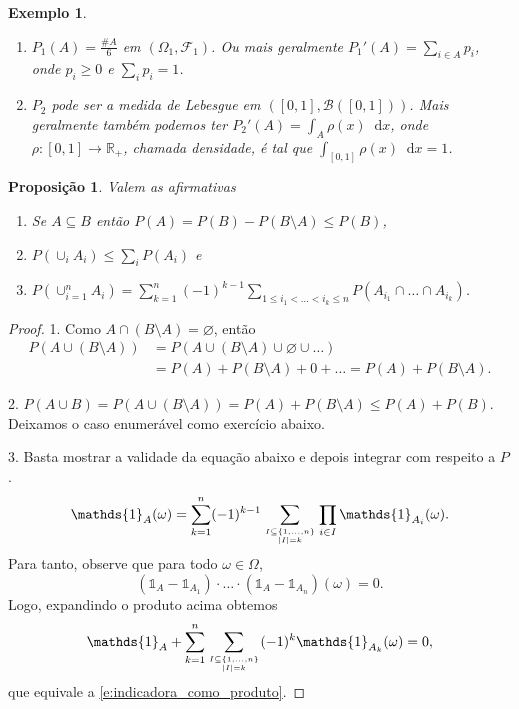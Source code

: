 \documentclass[reqno]{article}
\newcommand*\1{\mathds{1}}
\newtheorem{proposition}[theorem]{Proposição}
\newtheorem{example}{Exemplo}[section]
\renewcommand*\d{\mathop{}\!\mathrm{d}}
\begin{document}
\begin{example} \mbox{}
  \begin{enumerate}
  \item $P_1(A) = \tfrac{\#A}{6}$ em $(\Omega_1, \mathcal{F}_1)$.
    Ou mais geralmente $P_1'(A) = \sum_{i \in A} p_i$, onde $p_i \geq 0$ e $\sum_i p_i = 1$.
  \item $P_2$ pode ser a medida de Lebesgue em $([0,1], \mathcal{B}([0,1]))$.
    Mais geralmente também podemos ter $P_2'(A) = \int_A \rho(x) \d x$, onde $\rho:[0,1] \to \mathbb{R}_+$, chamada densidade, é tal que $\int_{[0,1]} \rho (x) \d x = 1$.
  \end{enumerate}
\end{example}

\begin{proposition}
  Valem as afirmativas
  \begin{enumerate}
  \item Se $A \subseteq B$ então $P(A) = P(B) - P(B \setminus A) \leq P(B)$,
  \item $P(\cup_i A_i) \leq \sum_i P(A_i)$ e
  \item $P(\cup_{i=1}^n A_i) = \sum_{k = 1}^n (-1)^{k-1} \sum_{1 \leq i_1 < \dots < i_k \leq n} P(A_{i_1} \cap \dots \cap A_{i_k})$.
  \end{enumerate}
\end{proposition}


\begin{proof}
  1.
  Como $A \cap (B \setminus A) = \varnothing$, então
  \begin{equation}
    \begin{split}
      P(A \cup (B \setminus A)) & = P(A \cup (B \setminus A) \cup \varnothing \cup \dots)\\
      & = P(A) + P(B \setminus A) + 0 + \dots = P(A) + P(B \setminus A).
    \end{split}
  \end{equation}

  2.
  $P(A \cup B) = P (A \cup (B \setminus A)) = P(A) + P(B \setminus A) \leq P(A) + P(B)$.
  Deixamos o caso enumerável como exercício abaixo.

  3.
  Basta mostrar a validade da equação abaixo e depois integrar com respeito a $P$.
  \begin{equation}
    \label{e:indicadora_como_produto}
    \1_A(\omega) = \sum_{k=1}^n (-1)^{k - 1} \sum_{I \subseteq \{1, \dots, n\} \atop |I| = k} \prod_{i \in I} \1_{A_i}(\omega).
  \end{equation}
  Para tanto, observe que para todo $\omega \in \Omega$,
  \begin{equation}
    (\1_A - \1_{A_1}) \cdot \dots \cdot (\1_A - \1_{A_n})(\omega) = 0.
  \end{equation}
  Logo, expandindo o produto acima obtemos
  \begin{equation}
    \1_A + \sum_{k = 1}^n \sum_{I \subseteq \{1, \dots, n\} \atop |I| = k} (-1)^k \1_{A_k}(\omega) = 0,
  \end{equation}
  que equivale a \eqref{e:indicadora_como_produto}.
\end{proof}
\end{document}
